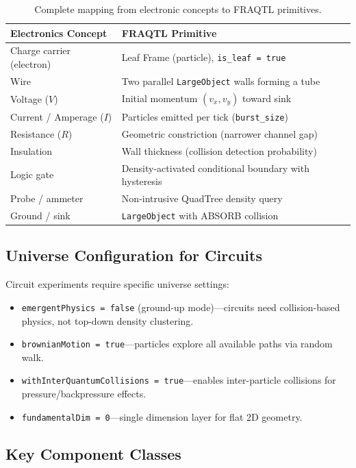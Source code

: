 \documentclass[11pt,a4paper]{article}
\begin{document}
\begin{table}[H]
\centering
\begin{tabular}{ll}
\toprule
\textbf{Electronics Concept} & \textbf{FRAQTL Primitive} \\
\midrule
Charge carrier (electron) & Leaf Frame (particle), \texttt{is\_leaf = true} \\
Wire & Two parallel \texttt{LargeObject} walls forming a tube \\
Voltage ($V$) & Initial momentum $(v_x, v_y)$ toward sink \\
Current / Amperage ($I$) & Particles emitted per tick (\texttt{burst\_size}) \\
Resistance ($R$) & Geometric constriction (narrower channel gap) \\
Insulation & Wall thickness (collision detection probability) \\
Logic gate & Density-activated conditional boundary with hysteresis \\
Probe / ammeter & Non-intrusive QuadTree density query \\
Ground / sink & \texttt{LargeObject} with ABSORB collision \\
\bottomrule
\end{tabular}
\caption{Complete mapping from electronic concepts to FRAQTL primitives.}
\end{table}

\subsection{Universe Configuration for Circuits}

Circuit experiments require specific universe settings:

\begin{itemize}
    \item \texttt{emergentPhysics = false} (ground-up mode)---circuits need collision-based physics, not top-down density clustering.
    \item \texttt{brownianMotion = true}---particles explore all available paths via random walk.
    \item \texttt{withInterQuantumCollisions = true}---enables inter-particle collisions for pressure/backpressure effects.
    \item \texttt{fundamentalDim = 0}---single dimension layer for flat 2D geometry.
\end{itemize}

\subsection{Key Component Classes}
\end{document}
